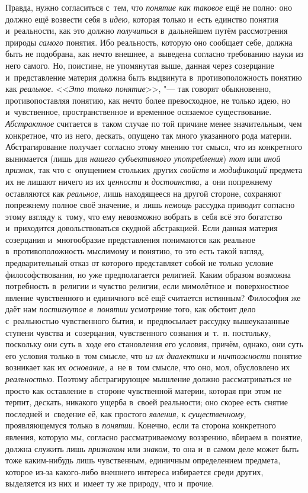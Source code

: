 Правда, нужно согласиться с~тем, что {\em понятие как таковое}
ещё не полно: оно должно ещё возвести себя в {\em идею,} которая
только и~есть единство понятия и~реальности, как это должно
{\em получиться} в~дальнейшем путём рассмотрения природы
{\em самого} понятия. Ибо
реальность, которую оно сообщает себе, должна быть не подобрана, как нечто
внешнее, а~выведена согласно требованию науки из него самого. Но, поистине,
не упомянутая выше, данная через созерцание и~представление материя должна
быть выдвинута в~противоположность понятию как {\em реальное}.
<<{\em Это только понятие}>>, "---
так говорят обыкновенно, противопоставляя понятию, как нечто
более превосходное, не только идею, но и~чувственное, пространственное и
временное осязаемое существование. {\em Абстрактное}
считается в~таком случае по той причине менее значительным,
чем конкретное, что из него, дескать, опущено так много указанного рода
материи. Абстрагирование получает согласно этому мнению тот смысл, что из
конкретного вынимается (лишь для {\em нашего субъективного
употребления}) {\em тот} или {\em иной признак,}
так что с~опущением стольких других {\em свойств} и {\em модификаций}
предмета их не лишают ничего из их {\em ценности} и {\em достоинства,} а~они
попрежнему оставляются как {\em реальное,} лишь находящееся на другой
стороне, сохраняют попрежнему полное своё значение, и~лишь {\em немощь}
рассудка приводит согласно этому взгляду к~тому, что ему
невозможно вобрать в~себя всё это богатство и~приходится довольствоваться
скудной абстракцией. Если данная материя созерцания и~многообразие
представления понимаются как реальное в~противоположность мыслимому и
понятию, то это есть такой взгляд, предварительный отказ от которого
представляет собой не только условие философствования, но уже
предполагается религией. Каким образом возможна потребность в~религии и
чувство религии, если мимолётное и~поверхностное явление чувственного и
единичного всё ещё считается истинным? Философия же даёт нам
{\em постигнутое в~понятии}
усмотрение того, как обстоит дело с~реальностью чувственного
бытия, и~предпосылает рассудку вышеуказанные ступени чувства и~созерцания,
чувственного сознания и~т.~п. постольку, поскольку они суть
в~ходе его становления его условия, причём, однако, они суть его условия
только в~том смысле, что {\em из их диалектики} и
{\em ничтожности} понятие возникает как их {\em основание,}
а~не в~том смысле, что оно, мол, обусловлено их {\em реальностью}.
Поэтому абстрагирующее мышление должно рассматриваться не
просто как оставление в~стороне чувственной материи, которая при этом не
терпит, дескать, никакого ущерба в~своей реальности; оно скорее есть снятие
последней и~сведение её, как простого {\em явления,} к {\em существенному,}
проявляющемуся только в {\em понятии}. Конечно,
если та сторона конкретного явления, которую мы, согласно рассматриваемому
воззрению, вбираем в~понятие, должна служить лишь
{\em признаком} или {\em знаком,} то она и~в
самом деле может быть тоже каким-нибудь лишь чувственным, единичным
определением предмета, которое из-за какого-либо внешнего интереса
избирается среди других, выделяется из них и~имеет ту же природу, что и~прочие.

